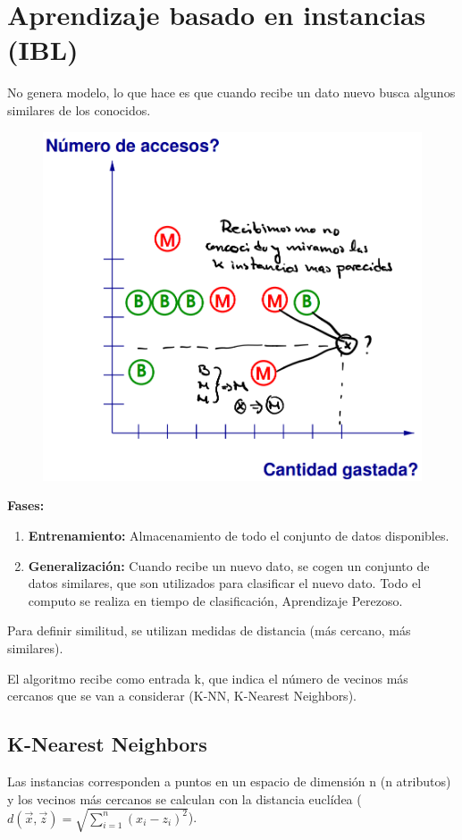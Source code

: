 \documentclass[12pt]{report} %
\begin{document}
\section{Aprendizaje basado en instancias (IBL)}
No genera modelo, lo que hace es que cuando recibe un dato nuevo busca algunos similares de los conocidos.
\begin{figure}[H]
	{\includegraphics[scale=.3]{2021-03-19 12_05_34-Aprendizaje basado en instancias y no supervisados.pdf - Foxit Reader.png}}
\end{figure}
\textbf{Fases:}
\begin{enumerate}
  \item \textbf{Entrenamiento:} Almacenamiento de todo el conjunto de datos disponibles.
  \item \textbf{Generalización:} Cuando recibe un nuevo dato, se cogen un conjunto de datos similares, que son utilizados para clasificar el nuevo dato. Todo el computo se realiza en tiempo de clasificación, Aprendizaje Perezoso.
\end{enumerate}
Para definir similitud, se utilizan medidas de distancia (más cercano, más similares).

El algoritmo recibe como entrada k, que indica el número de vecinos más cercanos que se van a considerar (K-NN, K-Nearest Neighbors). 

\subsection{K-Nearest Neighbors}
Las instancias corresponden a puntos en un espacio de dimensión n (n atributos) y los vecinos más cercanos se calculan con la distancia euclídea ($d\left( \vec{x},\vec{z}\right)   = \sqrt {\sum _{i=1}^{n}  \left( x_{i}-z_{i}\right)^2 }$).
\end{document}
